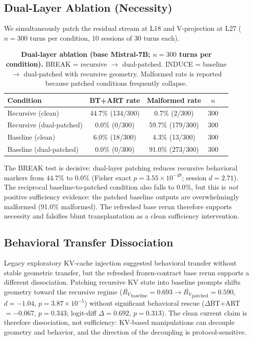 \documentclass{article}
\newcommand{\RV}{R_V}
\newcommand{\dcohen}{d}
\begin{document}
\subsection{Dual-Layer Ablation (Necessity)}
\label{sec:necessity}

We simultaneously patch the residual stream at L18 and V-projection at L27
($n = 300$ turns per condition, 10 sessions of 30 turns each).

\begin{table}[ht]
\centering
\caption{\textbf{Dual-layer ablation (base Mistral-7B; $n = 300$ turns per condition).}
         BREAK = recursive $\to$ dual-patched.
         INDUCE = baseline $\to$ dual-patched with recursive geometry.
         Malformed rate is reported because patched conditions frequently collapse.}
\label{tab:duallayer}
\smallskip
\begin{tabular}{lcccc}
\toprule
\textbf{Condition} & \textbf{BT+ART rate} & \textbf{Malformed rate} & \textbf{$n$} \\
\midrule
Recursive (clean)       & 44.7\% (134/300) & 0.7\% (2/300) & 300 \\
Recursive (dual-patched) & 0.0\% (0/300) & 59.7\% (179/300) & 300 \\
\midrule
Baseline (clean)        & 6.0\% (18/300)   & 4.3\% (13/300) & 300 \\
Baseline (dual-patched)  & 0.0\% (0/300)    & 91.0\% (273/300) & 300 \\
\bottomrule
\end{tabular}
\end{table}

The BREAK test is decisive: dual-layer patching reduces recursive behavioral
markers from $44.7\%$ to $0.0\%$ (Fisher exact $p = 3.55 \times 10^{-49}$;
session $\dcohen = 2.71$).
The reciprocal baseline-to-patched condition also falls to $0.0\%$, but this is
\emph{not} positive sufficiency evidence: the patched baseline outputs are overwhelmingly malformed
(91.0\% malformed).
The refreshed base rerun therefore supports necessity and falsifies blunt transplantation as a clean
sufficiency intervention.

\subsection{Behavioral Transfer Dissociation}
\label{sec:dissoc_behavioral}

Legacy exploratory KV-cache injection suggested behavioral transfer without stable geometric
transfer, but the refreshed frozen-contract base rerun supports a different dissociation.
Patching recursive KV state into baseline prompts shifts geometry toward the recursive regime
($\bar{\RV}_\mathrm{baseline} = 0.693 \to \bar{\RV}_\mathrm{patched} = 0.590$,
$\dcohen = -1.04$, $p = 3.87 \times 10^{-5}$) without significant behavioral rescue
($\Delta$BT+ART$ = -0.067$, $p = 0.343$; logit-diff $\Delta = 0.692$, $p = 0.313$).
The clean current claim is therefore dissociation, not sufficiency:
KV-based manipulations can decouple geometry and behavior, and the direction of the decoupling is
protocol-sensitive.
\end{document}
